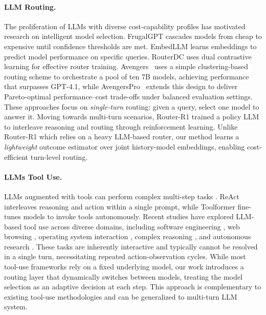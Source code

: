 \paragraph{LLM Routing.}
The proliferation of LLMs with diverse cost-capability profiles has motivated research on intelligent model selection. FrugalGPT \citep{chen2023frugalgpt} cascades models from cheap to expensive until confidence thresholds are met. EmbedLLM \citep{wang2024embedllm} learns embeddings to predict model performance on specific queries. 
RouterDC \citep{chen2024routerdc} uses dual contrastive learning for effective router training.
Avengers~\cite{zhang2025avengers} uses a simple clustering-based routing scheme to orchestrate a pool of ten 7B models, achieving performance that surpasses GPT-4.1, while AvengersPro~\cite{zhang2025beyond} extends this design to deliver Pareto-optimal performance--cost trade-offs under balanced evaluation settings.
These approaches focus on \emph{single-turn} routing: given a query, select one model to answer it. 
Moving towards multi-turn scenarios, Router-R1 \citep{zhang2025router} trained a policy LLM to interleave reasoning and routing through reinforcement learning. Unlike Router-R1 which relies on a heavy LLM-based router, our method learns a \textit{lightweight} outcome estimator over joint history-model embeddings, enabling cost-efficient turn-level routing.


\paragraph{LLMs Tool Use.}
LLMs augmented with tools can perform complex multi-step tasks \citep{schick2023toolformer,qin2023toolllm}. ReAct \citep{yao2023react} interleaves reasoning and action within a single prompt, while Toolformer \citep{schick2023toolformer} fine-tunes models to invoke tools autonomously. Recent studies have explored LLM-based tool use across diverse domains, including software engineering \citep{jimenez2024swebench,yang2024sweagent}, web browsing \citep{zhou2024webarena}, operating system interaction \citep{xie2024osworld}, complex reasoning \citep{mialon2023gaiabenchmarkgeneralai}, and autonomous research \citep{team2025tongyi}. These tasks are inherently interactive and typically cannot be resolved in a single turn, necessitating repeated action-observation cycles.
While most tool-use frameworks rely on a fixed underlying model, our work introduces a routing layer that dynamically switches between models, treating the model selection as an adaptive decision at each step. This approach is complementary to existing tool-use methodologies and can be generalized to multi-turn LLM system.